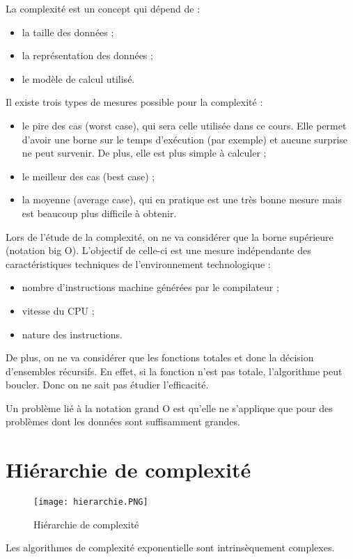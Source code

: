 La complexité est un concept qui dépend de : 
\begin{itemize}
\item la taille des données ;
\item la représentation des données ;
\item le modèle de calcul utilisé.
\end{itemize}

Il existe trois types de mesures possible pour la complexité : 
\begin{itemize}
\item le pire des cas (worst case), qui sera celle utilisée dans ce cours. Elle permet d'avoir une borne sur le temps d'exécution (par exemple) et aucune surprise ne peut survenir. De plus, elle est plus simple à calculer ;
\item le meilleur des cas (best case) ;
\item la moyenne (average case), qui en pratique est une très bonne mesure mais est beaucoup plus difficile à obtenir.
\end{itemize}


Lors de l'étude de la complexité, on ne va considérer que la borne supérieure
(notation big O). L'objectif de celle-ci est une mesure indépendante des caractéristiques techniques de l'environnement technologique :
\begin{itemize}
\item nombre d'instructions machine générées par le compilateur ;
\item vitesse du CPU ;
\item nature des instructions.
\end{itemize}


De plus, on ne va considérer que les fonctions totales et
donc la décision d'ensembles récursifs.
En effet, si la fonction n'est pas totale, l'algorithme peut boucler.
Donc on ne sait pas étudier l'efficacité.

\begin{myrem}
	Un problème lié à la notation grand O est qu'elle ne s'applique que pour des problèmes dont les données sont suffisamment grandes.
\end{myrem}

\section{Hiérarchie de complexité}
\begin{figure}[H]
    \centering
    \texttt{[image: hierarchie.PNG]}
    \caption{Hiérarchie de complexité}
    \label{Hierarchie}
\end{figure}
Les algorithmes de complexité exponentielle sont intrinsèquement complexes.


